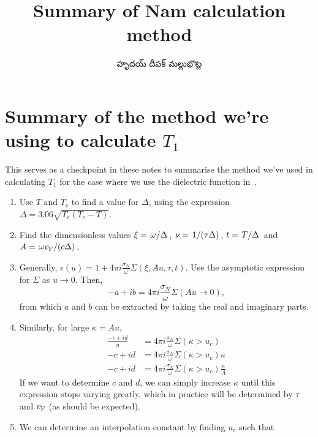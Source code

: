 \documentclass[../main.tex]{subfiles}
\title{Summary of Nam calculation method}
\author{\begin{telugu}హృదయ్ దీపక్ మల్లుభొట్ల\end{telugu}}
\date{}
\begin{document}
	\graphicspath{{\main/figures/}}

	\onlyinsubfile{\maketitle}

	\section{Summary of the method we're using to calculate \texorpdfstring{$T_1$}{T1}} \label{sec:overallsummary:norm}

	This serves as a checkpoint in these notes to summarise the method we've used in calculating $T_{1}$ for the case where we use the dielectric function in~\cite{Nam1967}.

	\begin{enumerate}
		\item Use $T$ and $T_c$ to find a value for $\Delta$, using the expression $\Delta = 3.06 \sqrt{T_c(T_c - T)}$.
		\item Find the dimensionless values $\xi = \flatfrac{\omega}{\Delta}$, $\nu = \flatfrac{1}{(\tau \Delta)}$,  $t = \flatfrac{T}{\Delta}$ and $A = \flatfrac{\omega \vf}{(c \Delta)}$.
		\item Generally, $\epsilon(u) = 1 + 4 \pi i \frac{\sigma_N}{\omega} \Sigma(\xi, A u, \tau, t)$.
		Use the asymptotic expression for $\Sigma$ as $u \rightarrow 0$.
		Then,
		\begin{equation}
			-a + ib = 4 \pi i \frac{\sigma_N}{\omega} \Sigma(A u \rightarrow 0),
		\end{equation}
		from which $a$ and $b$ can be extracted by taking the real and imaginary parts.
		\item Similarly, for large $\kappa = A u$,
		\begin{align}
			\frac{-c + i d}{u} &= 4 \pi i \frac{\sigma_N}{\omega} \Sigma(\kappa > u_c) \\
			- c + i d &= 4 \pi i \frac{\sigma_N}{\omega} \Sigma(\kappa > u_c) u \\
			- c + i d &= 4 \pi i \frac{\sigma_N}{\omega} \Sigma(\kappa > u_c) \frac{\kappa}{A}
		\end{align}
		If we want to determine $c$ and $d$, we can simply increase $\kappa$ until this expression stops varying greatly, which in practice will be determined by $\tau$ and $v_{\mathrm{F}}$ (as should be expected).
		\item We can determine an interpolation constant by finding $u_c$ such that
		\begin{align}

\end{align}
\end{enumerate}
\end{document}
